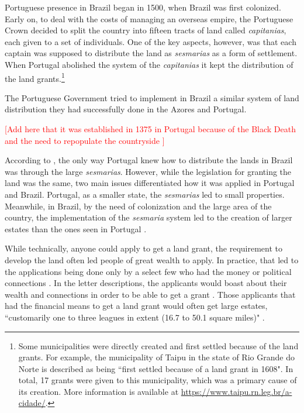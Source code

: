 \documentclass[11pt]{article}
\newcommand{\red}[1]{\textcolor{red}{#1}}
\begin{document}
Portuguese presence in Brazil began in 1500, when Brazil was first colonized. 
Early on, to deal with the costs of managing an overseas empire, the Portuguese Crown decided to split the country into fifteen tracts of land called \textit{capitanias}, each given to a set of individuals.
One of the key aspects, however, was that each captain was supposed to distribute the land as \textit{sesmarias} as a form of settlement. 
When Portugal abolished the system of the \textit{capitanias} it kept the distribution of the land grants.\footnote{Some municipalities were directly created and first settled because of the land grants. For example, the municipality of Taipu in the state of Rio Grande do Norte is described as being ``first settled because of a land grant in 1608". In total, 17 grants were given to this municipality, which was a primary cause of its creation. More information is available at \url{https://www.taipu.rn.leg.br/a-cidade/}.}

The Portuguese Government tried to implement in Brazil a similar system of land distribution they had successfully done in the Azores and Portugal.

\red{[Add here that it was established in 1375 in Portugal because of the Black Death and the need to repopulate the countryside \parencite{Nozoe2006-hj}]}

According to \textcite{Smith1944-oi}, the only way Portugal knew how to distribute the lands in Brazil was through the large \textit{sesmarias}.
However, while the legislation for granting the land was the same, two main issues differentiated how it was applied in Portugal and Brazil. 
Portugal, as a smaller state, the \textit{sesmarias} led to small properties. 
Meanwhile, in Brazil, by the need of colonization and the large area of the country, the implementation of the \textit{sesmaria} system led to the creation of larger estates than the ones seen in Portugal \parencites[p.~58-59]{Da_Costa_Porto1979-dz}[p.~28]{Diffie1987-bw}[p.~23-24]{Panini1990-rj}.

While technically, anyone could apply to get a land grant, the requirement to develop the land often led people of great wealth to apply.
In practice, that led to the applications being done only by a select few who had the money or political connections \parencites[p~434]{Diffie1987-bw}.
In the letter descriptions, the applicants would boast about their wealth and connections in order to be able to get a grant \parencite[p.~36]{Lima1954-td}. 
Those applicants that had the financial means to get a land grant would often get large estates, ``customarily one to three leagues in extent (16.7 to 50.1 square miles)" \parencite{Dean1971-iq}.
\end{document}
